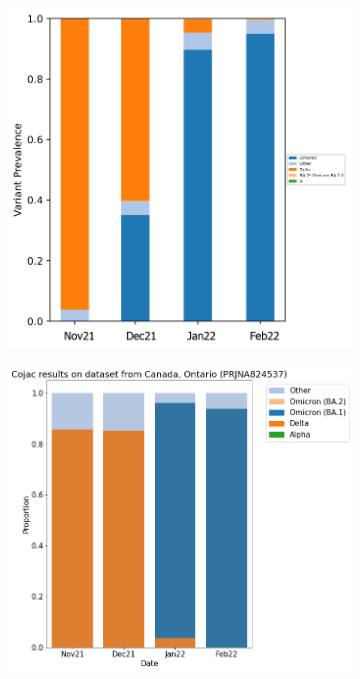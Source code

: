     \begin{figure}[H]
        \centering
        \begin{subfigure}[b]{0.6\textwidth}
        \includegraphics[width=1\textwidth]{figures/results/real/ca-freyja-monthly.png}
        \label{fig:results:real:ca-freyja-monthly}
        \end{subfigure}
        \hfill
        \begin{subfigure}[b]{0.7\textwidth}
        \includegraphics[width=1\textwidth]{figures/results/real/ca-cojac-monthly.png}
        \label{fig:results:real:ca-cojac-monthly}
        \end{subfigure}
        \hfill
    \end{figure}
    

